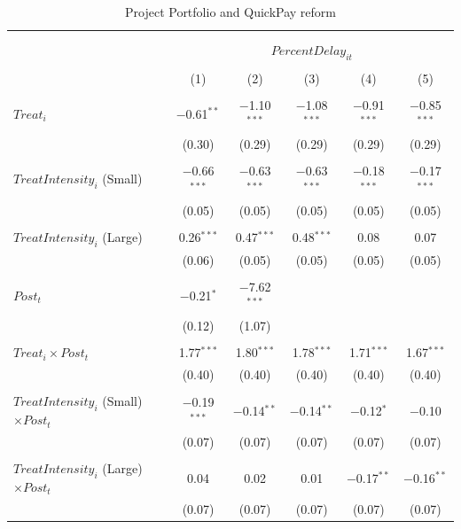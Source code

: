 \documentclass[
]{article}
\begin{document}
\begin{table}[H] \centering 
  \caption{Project Portfolio and QuickPay reform} 
  \label{} 
\small 
\begin{tabular}{@{\extracolsep{-2pt}}lccccc} 
\\[-1.8ex]\hline 
\hline \\[-1.8ex] 
\\[-1.8ex] & \multicolumn{5}{c}{$PercentDelay_{it}$  } \\ 
\\[-1.8ex] & (1) & (2) & (3) & (4) & (5)\\ 
\hline \\[-1.8ex] 
 $Treat_i$ & $-$0.61$^{**}$ & $-$1.10$^{***}$ & $-$1.08$^{***}$ & $-$0.91$^{***}$ & $-$0.85$^{***}$ \\ 
  & (0.30) & (0.29) & (0.29) & (0.29) & (0.29) \\ 
  & & & & & \\ 
 $TreatIntensity_i$ (Small) & $-$0.66$^{***}$ & $-$0.63$^{***}$ & $-$0.63$^{***}$ & $-$0.18$^{***}$ & $-$0.17$^{***}$ \\ 
  & (0.05) & (0.05) & (0.05) & (0.05) & (0.05) \\ 
  & & & & & \\ 
 $TreatIntensity_i$ (Large) & 0.26$^{***}$ & 0.47$^{***}$ & 0.48$^{***}$ & 0.08 & 0.07 \\ 
  & (0.06) & (0.05) & (0.05) & (0.05) & (0.05) \\ 
  & & & & & \\ 
 $Post_t$ & $-$0.21$^{*}$ & $-$7.62$^{***}$ &  &  &  \\ 
  & (0.12) & (1.07) &  &  &  \\ 
  & & & & & \\ 
 $Treat_i \times Post_t$ & 1.77$^{***}$ & 1.80$^{***}$ & 1.78$^{***}$ & 1.71$^{***}$ & 1.67$^{***}$ \\ 
  & (0.40) & (0.40) & (0.40) & (0.40) & (0.40) \\ 
  & & & & & \\ 
 $TreatIntensity_i$ (Small) $\times Post_t$ & $-$0.19$^{***}$ & $-$0.14$^{**}$ & $-$0.14$^{**}$ & $-$0.12$^{*}$ & $-$0.10 \\ 
  & (0.07) & (0.07) & (0.07) & (0.07) & (0.07) \\ 
  & & & & & \\ 
 $TreatIntensity_i$ (Large) $\times Post_t$ & 0.04 & 0.02 & 0.01 & $-$0.17$^{**}$ & $-$0.16$^{**}$ \\ 
  & (0.07) & (0.07) & (0.07) & (0.07) & (0.07) \\ 

\end{tabular}
\end{table}
\end{document}
